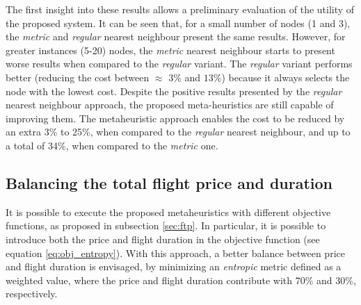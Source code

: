 The first insight into these results allows a preliminary evaluation of the utility of the proposed system. It can be seen that, for a small number of nodes (1 and 3), the \textit{metric} and \textit{regular} nearest neighbour present the same results. However, for greater instances (5-20) nodes, the \textit{metric} nearest neighbour starts to present worse results when compared to the \textit{regular} variant. The \textit{regular} variant performs better (reducing the cost between $\approx$ $3\%$ and $13\%$) because it always selects the node with the lowest cost. Despite the positive results presented by the \textit{regular} nearest neighbour approach, the proposed meta-heuristics are still capable of improving them. The metaheuristic approach enables the cost to be reduced by an extra 3\% to 25\%, when compared to the \textit{regular} nearest neighbour, and up to a total of 34\%, when compared to the \textit{metric} one. 



\subsection{Balancing the total flight price and duration}
\label{sec:ftp_obj_func_eval}

It is possible to execute the proposed metaheuristics with different objective functions, as proposed in subsection \ref{sec:ftp}. In particular, it is possible to introduce both the price and flight duration in the objective function (see equation \ref{eq:obj_entropy}). With this approach, a better balance between price and flight duration is envisaged, by minimizing an \textit{entropic} metric defined as a weighted value, where the price and flight duration contribute with 70\% and 30\%, respectively. 

